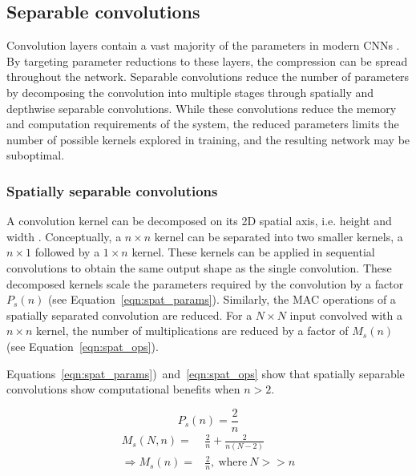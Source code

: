 \documentclass{article}
\begin{document}
	\subsection{Separable convolutions}
	
	Convolution layers contain a vast majority of the parameters in modern CNNs \cite{inception,mobilenet,resnetv2}. By targeting parameter reductions to these layers, the compression can be spread throughout the network. Separable convolutions reduce the number of parameters by decomposing the convolution into multiple stages through spatially and depthwise separable convolutions. While these convolutions reduce the memory and computation requirements of the system, the reduced parameters limits the number of possible kernels explored in training, and the resulting network may be suboptimal.
	
	\subsubsection{Spatially separable convolutions}
	
	A convolution kernel can be decomposed on its 2D spatial axis, i.e. height and width \cite{inception,adscnet,effnet,squeezenet}. Conceptually, a $n \times n$ kernel can be separated into two smaller kernels, a $n \times 1$ followed by a $1 \times n$ kernel. These kernels can be applied in sequential convolutions to obtain the same output shape as the single convolution. These decomposed kernels scale the parameters required by the convolution by a factor $P_s(n)$ (see Equation~\ref{eqn:spat_params}). Similarly, the MAC operations of a spatially separated convolution are reduced. For a $N \times N$ input convolved with a $n \times n$ kernel, the number of multiplications are reduced by a factor of $M_s(n)$ (see Equation~\ref{eqn:spat_ops}). 
	
	Equations~\ref{eqn:spat_params})~and~\ref{eqn:spat_ops} show that spatially separable convolutions show computational benefits when $n > 2$. 
	
	\vspace{-1cm}
	
	\begin{multicols}{2}
		\begin{equation}\label{eqn:spat_params}
			P_s(n) = \frac{2}{n}
		\end{equation}
	\break
		\begin{equation}\label{eqn:spat_ops}
			\begin{split}
				M_s(N, n) = & \frac{2}{n} + \frac{2}{n(N-2)} \\
				\Rightarrow M_s(n) = & \frac{2}{n},~\text{where}~N >> n
			\end{split}
		\end{equation}		
	\end{multicols}
	
\end{document}
